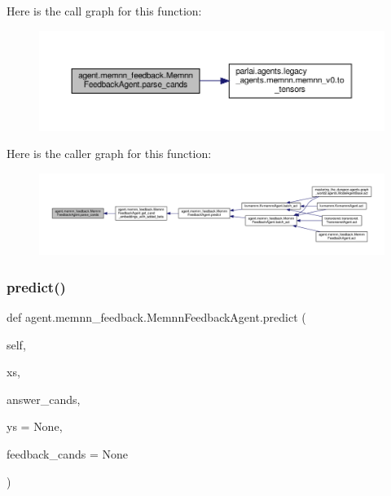 Here is the call graph for this function\+:
\nopagebreak
\begin{figure}[H]
\begin{center}
\leavevmode
\includegraphics[width=350pt]{classagent_1_1memnn__feedback_1_1MemnnFeedbackAgent_a4012774ea6fbe10c6315f1c010d63f09_cgraph}
\end{center}
\end{figure}
Here is the caller graph for this function\+:
\nopagebreak
\begin{figure}[H]
\begin{center}
\leavevmode
\includegraphics[width=350pt]{classagent_1_1memnn__feedback_1_1MemnnFeedbackAgent_a4012774ea6fbe10c6315f1c010d63f09_icgraph}
\end{center}
\end{figure}
\mbox{\label{classagent_1_1memnn__feedback_1_1MemnnFeedbackAgent_a5adbaa50b1fb0a4f338912b6983461d6}} 
\subsubsection{\texorpdfstring{predict()}{predict()}}
{\footnotesize\ttfamily def agent.\+memnn\+\_\+feedback.\+Memnn\+Feedback\+Agent.\+predict (\begin{DoxyParamCaption}\item[{}]{self,  }\item[{}]{xs,  }\item[{}]{answer\+\_\+cands,  }\item[{}]{ys = {\ttfamily None},  }\item[{}]{feedback\+\_\+cands = {\ttfamily None} }\end{DoxyParamCaption})}



